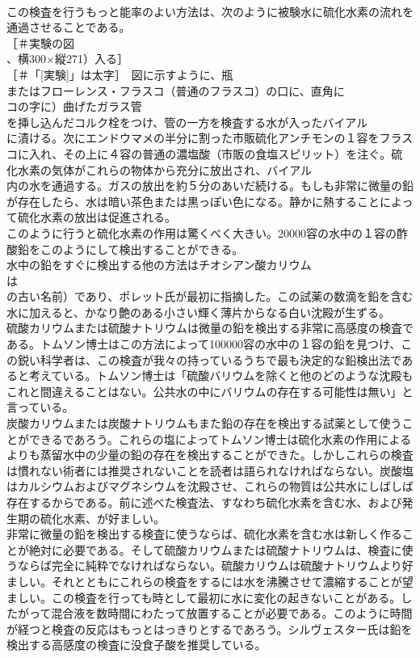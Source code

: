 \documentclass[8pt]{extreport}
\begin{document}
\begin{CJK}{UTF8}{min}
\\	この検査を行うもっと能率のよい方法は、次のように被験水に硫化水素の流れを通過させることである。
\\	［＃実験の図
\\	、横300×縦271）入る］
\\	[実験]［＃「[実験]」は太字］　図に示すように、瓶
\\	またはフローレンス・フラスコ（普通のフラスコ）の口に、直角に
\\	コの字に）曲げたガラス管
\\	を挿し込んだコルク栓をつけ、管の一方を検査する水が入ったバイアル
\\	に漬ける。次にエンドウマメの半分に割った市販硫化アンチモンの１容をフラスコに入れ、その上に４容の普通の濃塩酸（市販の食塩スピリット）を注ぐ。硫化水素の気体がこれらの物体から充分に放出され、バイアル
\\	内の水を通過する。ガスの放出を約５分のあいだ続ける。もしも非常に微量の鉛が存在したら、水は暗い茶色または黒っぽい色になる。静かに熱することによって硫化水素の放出は促進される。
\\	このように行うと硫化水素の作用は驚くべく大きい。20000容の水中の１容の酢酸鉛をこのようにして検出することができる。
\\	水中の鉛をすぐに検出する他の方法はチオシアン酸カリウム
\\	は
\\	の古い名前）であり、ポレット氏が最初に指摘した。この試薬の数滴を鉛を含む水に加えると、かなり艶のある小さい輝く薄片からなる白い沈殿が生ずる。
\\	硫酸カリウムまたは硫酸ナトリウムは微量の鉛を検出する非常に高感度の検査である。トムソン博士はこの方法によって100000容の水中の１容の鉛を見つけ、この鋭い科学者は、この検査が我々の持っているうちで最も決定的な鉛検出法であると考えている。トムソン博士は「硫酸バリウムを除くと他のどのような沈殿もこれと間違えることはない。公共水の中にバリウムの存在する可能性は無い」と言っている。
\\	炭酸カリウムまたは炭酸ナトリウムもまた鉛の存在を検出する試薬として使うことができるであろう。これらの塩によってトムソン博士は硫化水素の作用によるよりも蒸留水中の少量の鉛の存在を検出することができた。しかしこれらの検査は慣れない術者には推奨されないことを読者は語られなければならない。炭酸塩はカルシウムおよびマグネシウムを沈殿させ、これらの物質は公共水にしばしば存在するからである。前に述べた検査法、すなわち硫化水素を含む水、および発生期の硫化水素、が好ましい。
\\	非常に微量の鉛を検出する検査に使うならば、硫化水素を含む水は新しく作ることが絶対に必要である。そして硫酸カリウムまたは硫酸ナトリウムは、検査に使うならば完全に純粋でなければならない。硫酸カリウムは硫酸ナトリウムより好ましい。それとともにこれらの検査をするには水を沸騰させて濃縮することが望ましい。この検査を行っても時として最初に水に変化の起きないことがある。したがって混合液を数時間にわたって放置することが必要である。このように時間が経つと検査の反応はもっとはっきりとするであろう。シルヴェスター氏は鉛を検出する高感度の検査に没食子酸を推奨している。

\end{CJK}
\end{document}
